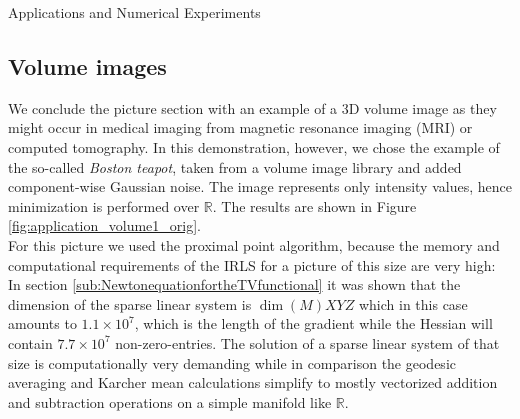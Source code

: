 \begin{chapter}{Applications and Numerical Experiments}
\subsection{Volume images} %
\label{sub:Volume images}
We conclude the picture section with an example of a 3D volume image as they might occur in medical imaging from magnetic resonance imaging (MRI) or
computed tomography. In this demonstration, however, we chose the example of the so-called \emph{Boston teapot}, taken from a volume image library \cite{volumeLib}
and added component-wise Gaussian noise. The image represents only intensity values, hence minimization is performed over $\mathbb{R}$. The results are shown
in Figure \ref{fig:application_volume1_orig}.\\

For this picture we used the proximal point algorithm, because the memory and computational requirements of the IRLS for a picture of this size are very high:
In section \ref{sub:NewtonequationfortheTVfunctional} it was shown that the dimension of the sparse linear system is $\operatorname{dim}(M)XYZ$ which
in this case amounts to $1.1\times 10^{7}$, which is the length of the gradient while the Hessian will contain $7.7\times 10^{7}$ non-zero-entries.
The solution of a sparse linear system of that size is computationally very demanding while in comparison the geodesic averaging and Karcher mean calculations
simplify to mostly vectorized addition and subtraction operations on a simple manifold like $\mathbb{R}$.


\end{chapter}
